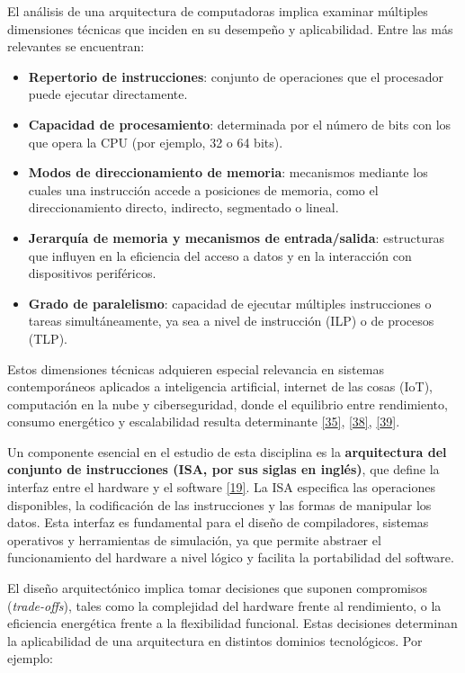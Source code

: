 \documentclass[12pt,oneside]{templates/unerthesis}
\providecommand{\tightlist}{%
  \setlength{\itemsep}{0pt}\setlength{\parskip}{0pt}}
\begin{document}
El análisis de una arquitectura de computadoras implica examinar múltiples dimensiones técnicas que inciden en su desempeño y aplicabilidad. Entre las más relevantes se encuentran:

\begin{itemize}
\tightlist
\item
  \textbf{Repertorio de instrucciones}: conjunto de operaciones que el procesador puede ejecutar directamente.
\item
  \textbf{Capacidad de procesamiento}: determinada por el número de bits con los que opera la CPU (por ejemplo, 32 o 64 bits).
\item
  \textbf{Modos de direccionamiento de memoria}: mecanismos mediante los cuales una instrucción accede a posiciones de memoria, como el direccionamiento directo, indirecto, segmentado o lineal.
\item
  \textbf{Jerarquía de memoria y mecanismos de entrada/salida}: estructuras que influyen en la eficiencia del acceso a datos y en la interacción con dispositivos periféricos.
\item
  \textbf{Grado de paralelismo}: capacidad de ejecutar múltiples instrucciones o tareas simultáneamente, ya sea a nivel de instrucción (ILP) o de procesos (TLP).
\end{itemize}

Estos dimensiones técnicas adquieren especial relevancia en sistemas contemporáneos aplicados a inteligencia artificial, internet de las cosas (IoT), computación en la nube y ciberseguridad, donde el equilibrio entre rendimiento, consumo energético y escalabilidad resulta determinante \protect\hyperlink{ref-harris2015digital}{{[}35{]}}, \protect\hyperlink{ref-patterson_computer_2016}{{[}38{]}}, \protect\hyperlink{ref-belli2020iot}{{[}39{]}}.

Un componente esencial en el estudio de esta disciplina es la \textbf{arquitectura del conjunto de instrucciones (ISA, por sus siglas en inglés)}, que define la interfaz entre el hardware y el software \protect\hyperlink{ref-hennessy2017computer}{{[}19{]}}. La ISA especifica las operaciones disponibles, la codificación de las instrucciones y las formas de manipular los datos. Esta interfaz es fundamental para el diseño de compiladores, sistemas operativos y herramientas de simulación, ya que permite abstraer el funcionamiento del hardware a nivel lógico y facilita la portabilidad del software.

El diseño arquitectónico implica tomar decisiones que suponen compromisos (\emph{trade-offs}), tales como la complejidad del hardware frente al rendimiento, o la eficiencia energética frente a la flexibilidad funcional. Estas decisiones determinan la aplicabilidad de una arquitectura en distintos dominios tecnológicos. Por ejemplo:
\end{document}
